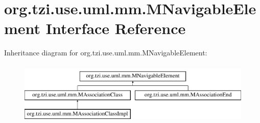 \hypertarget{interfaceorg_1_1tzi_1_1use_1_1uml_1_1mm_1_1_m_navigable_element}{\section{org.\-tzi.\-use.\-uml.\-mm.\-M\-Navigable\-Element Interface Reference}
\label{interfaceorg_1_1tzi_1_1use_1_1uml_1_1mm_1_1_m_navigable_element}
}
Inheritance diagram for org.\-tzi.\-use.\-uml.\-mm.\-M\-Navigable\-Element\-:\begin{figure}[H]
\begin{center}
\leavevmode
\includegraphics[height=3.000000cm]{interfaceorg_1_1tzi_1_1use_1_1uml_1_1mm_1_1_m_navigable_element}
\end{center}
\end{figure}

